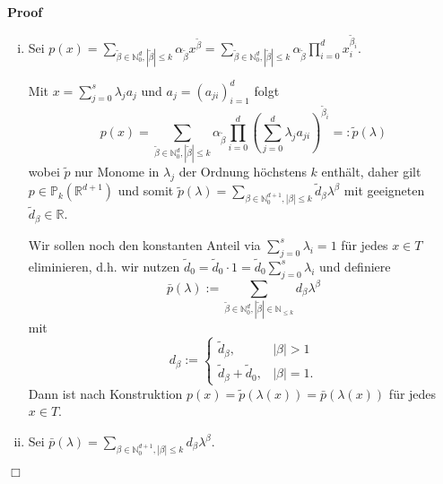 \documentclass{book}
\newcommand{\assign}{:=}
\newcommand{\backassign}{=:}
\newenvironment{enumerateroman}{\begin{enumerate}[i.] }{\end{enumerate}}
\newenvironment{proof}{\noindent\textbf{Proof\ }}{\hspace*{\fill}$\Box$\medskip}
\begin{document}
\begin{proof}
  
  \begin{enumerateroman}
    \item Sei $p (x) = \sum_{\tilde{\beta} \in \mathbb{N}_0^d, | \tilde{\beta}
    | \leqslant k} \alpha_{\tilde{\beta}} x^{\tilde{\beta}} =
    \sum_{\tilde{\beta} \in \mathbb{N}_0^d, | \tilde{\beta} | \leqslant k}
    \alpha_{\tilde{\beta}}  \prod_{i = 0}^d x_i^{\tilde{\beta}_i}$.
    
    Mit $x = \sum_{j = 0}^s \lambda_j a_j$ und $a_j = (a_{j i})_{i = 1}^d$
    folgt
    \[ p (x) = \sum_{\tilde{\beta} \in \mathbb{N}_0^d, | \tilde{\beta} |
       \leqslant k} \alpha_{\tilde{\beta}}  \prod_{i = 0}^d \left( \sum_{j =
       0}^d \lambda_j a_{j i} \right)^{\tilde{\beta}_i} \backassign \tilde{p}
       (\lambda) \]
    wobei $\tilde{p}$ nur Monome in $\lambda_j$ der Ordnung h{\"o}chstens $k$
    enth{\"a}lt, daher gilt $p \in \mathbb{P}_k (\mathbb{R}^{d + 1})$ und
    somit $\tilde{p} (\lambda) = \sum_{\beta \in \mathbb{N}_0^{d + 1}, | \beta
    | \leqslant k} \tilde{d}_{\beta} \lambda^{\beta}$ mit geeigneten
    $\tilde{d}_{\beta} \in \mathbb{R}$.
    
    Wir sollen noch den konstanten Anteil via $\sum_{j = 0}^s \lambda_i = 1$
    f{\"u}r jedes $x \in T$ eliminieren, d.h. wir nutzen $\tilde{d}_0 =
    \tilde{d}_0 \cdot 1 = \tilde{d}_0 \sum_{j = 0}^s \lambda_i$ und definiere
    \[ \bar{p} (\lambda) \assign \sum_{\tilde{\beta} \in \mathbb{N}_0^d, |
       \tilde{\beta} | \in \mathbb{N}_{\leqslant k}} d_{\beta} \lambda^{\beta}
    \]
    mit
    \[ d_{\beta} \assign \left\{\begin{array}{cl}
         \tilde{d}_{\beta}, & | \beta | > 1\\
         \tilde{d}_{\beta} + \tilde{d}_0, & | \beta | = 1.
       \end{array}\right. \]
    Dann ist nach Konstruktion $p (x) = \tilde{p} (\lambda (x)) = \bar{p}
    (\lambda (x))$ f{\"u}r jedes $x \in T$.
    
    \item Sei $\bar{p} (\lambda) = \sum_{\beta \in \mathbb{N}_0^{d + 1}, |
    \beta | \leqslant k} d_{\beta} \lambda^{\beta}$.
    

\end{enumerateroman}
\end{proof}
\end{document}
